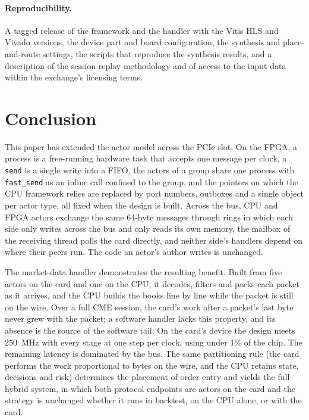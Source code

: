 \documentclass[11pt]{article}
\newcommand{\fs}{\texttt{fast\_send}}
\newcommand{\snd}{\texttt{send}}
\begin{document}
\paragraph{Reproducibility.} A tagged release of the framework and the handler
with the Vitis HLS and Vivado versions, the device part and board
configuration, the synthesis and place-and-route settings, the scripts that
reproduce the synthesis results, and a description of the session-replay
methodology and of access to the input data within the exchange's licensing
terms.

\section{Conclusion}

This paper has extended the actor model across the PCIe slot. On the FPGA, a
process is a free-running hardware task that accepts one message per clock, a
\snd{} is a single write into a FIFO, the actors of a group share one process
with \fs{} as an inline call confined to the group, and the pointers on which
the CPU framework relies are replaced by port numbers, outboxes and a single
object per actor type, all fixed when the design is built. Across the bus, CPU
and FPGA actors exchange the same 64-byte messages through rings in which each
side only writes across the bus and only reads its own memory, the mailbox of
the receiving thread polls the card directly, and neither side's handlers
depend on where their peers run. The code an actor's author writes is
unchanged.

The market-data handler demonstrates the resulting benefit. Built from five
actors on the card and one on the CPU, it decodes, filters and packs each
packet as it arrives, and the CPU builds the books line by line while the
packet is still on the wire. Over a full CME session, the card's work after a
packet's last byte never grew with the packet; a software handler lacks this
property, and its absence is the source of the software tail. On the card's
device the design meets 250~MHz with every stage at one step per clock, using
under 1\% of the chip. The remaining latency is dominated by the bus. The same
partitioning rule (the card performs the work proportional to bytes on the
wire, and the CPU retains state, decisions and risk) determines the placement
of order entry and yields the full hybrid system, in which both protocol
endpoints are actors on the card and the strategy is unchanged whether it runs
in backtest, on the CPU alone, or with the card.
\end{document}
